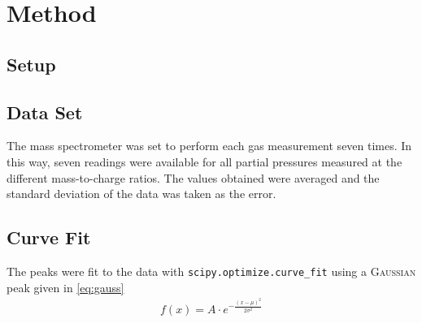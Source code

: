 \newpage
\section{Method} \label{sec:method}
\subsection{Setup}
\subsection{Data Set}
The mass spectrometer was set to perform each gas measurement seven times. In this way, seven readings were available for all partial pressures measured at the different mass-to-charge ratios. The values obtained were averaged and the standard deviation of the data was taken as the error. 

\subsection{Curve Fit}
\label{sec:fit}
The peaks were fit to the data with \texttt{scipy.optimize.curve\_fit}\cite{scipy} using a {\scshape Gaussian} peak given in \eqref{eq:gauss}
\begin{align}
    f(x) = A\cdot e^{-\frac{(x-\mu)^2}{2\sigma^2}} \label{eq:gauss}
\end{align}

